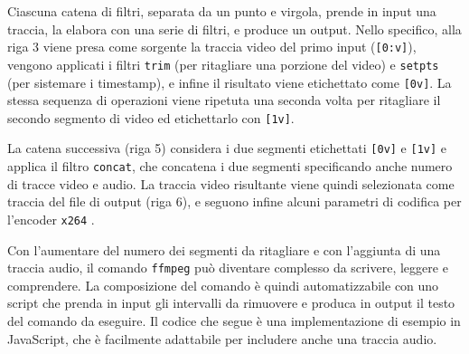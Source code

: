 Ciascuna catena di filtri, separata da un punto e virgola, prende in input una traccia, la elabora con una serie di filtri, e produce un output. Nello specifico, alla riga 3 viene presa come sorgente la traccia video del primo input (\texttt{[0:v]}), vengono applicati i filtri \texttt{trim} (per ritagliare una porzione del video) e \texttt{setpts} (per sistemare i timestamp\footnotemark{}), e infine il risultato viene etichettato come \texttt{[0v]}. La stessa sequenza di operazioni viene ripetuta una seconda volta per ritagliare il secondo segmento di video ed etichettarlo con \texttt{[1v]}.

La catena successiva (riga 5) considera i due segmenti etichettati \texttt{[0v]} e \texttt{[1v]} e applica il filtro \texttt{concat}, che concatena i due segmenti specificando anche numero di tracce video e audio. La traccia video risultante viene quindi selezionata come traccia del file di output (riga 6), e seguono infine alcuni parametri di codifica per l'encoder \texttt{x264} \cite{ozer}.



Con l'aumentare del numero dei segmenti da ritagliare e con l'aggiunta di una traccia audio, il comando \texttt{ffmpeg} può diventare complesso da scrivere, leggere e comprendere. La composizione del comando è quindi automatizzabile con uno script che prenda in input gli intervalli da rimuovere e produca in output il testo del comando da eseguire. Il codice che segue è una implementazione di esempio in JavaScript, che è facilmente adattabile per includere anche una traccia audio.

